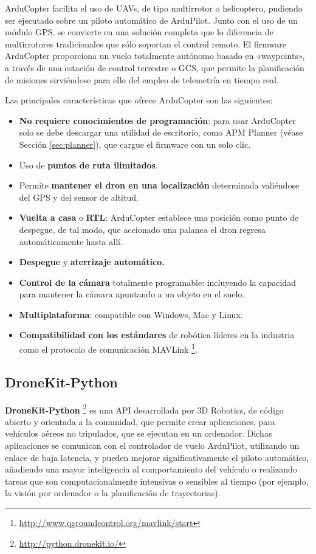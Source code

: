 ArduCopter facilita el uso de \acs{UAV}s, de tipo multirrotor o helicoptero, pudiendo ser ejecutado sobre un piloto automático de ArduPilot.
Junto con el uso de un módulo \acs{GPS}, se convierte en una solución completa que lo diferencia de multirrotores tradicionales que sólo 
soportan el control remoto. El firmware ArduCopter proporciona un vuelo totalmente autónomo basado en «waypoints», a través de 
una estación de control terrestre o \acs{GCS}, que permite la planificación de misiones sirviéndose para ello del empleo de telemetría en tiempo real.

Las principales características que ofrece ArduCopter son las siguientes:
\begin{itemize}
\item \textbf{No requiere conocimientos de programación}: para usar ArduCopter solo se debe descargar una utilidad de escritorio, como 
APM Planner (véase Sección \ref{sec:planner}), que cargue el firmware con un solo clic.
\item Uso de \textbf{puntos de ruta ilimitados}.
\item Permite \textbf{mantener el dron en una localización} determinada valiéndose del \acs{GPS} y del sensor de altitud.
\item \textbf{Vuelta a casa} o \textbf{\acs{RTL}}: ArduCopter establece una posición como punto de despegue, de tal modo, que accionado una palanca el dron regresa automáticamente hasta allí.
\item \textbf{Despegue} y \textbf{aterrizaje automático.}
\item \textbf{Control de la cámara} totalmente programable: incluyendo la capacidad para mantener la cámara apuntando a un objeto en el suelo.
\item \textbf{Multiplataforma}: compatible con Windows, Mac y Linux.
\item \textbf{Compatibilidad con los estándares} de robótica líderes en la industria como el protocolo de comunicación MAVLink \footnote{\url{http://www.qgroundcontrol.org/mavlink/start}}.
\end{itemize}

\subsection{DroneKit-Python}
\label{sec:dronekit}

\textbf{DroneKit-Python} \footnote{\url{http://python.dronekit.io/}} es una \acs{API} desarrollada por 3D Robotics, de código abierto y orientada a la comunidad, que permite crear aplicaciones, para vehículos aéreos no tripulados, que se 
ejecutan en un ordenador. Dichas aplicaciones se comunican con el controlador de vuelo ArduPilot, utilizando un enlace de baja latencia, y pueden mejorar significativamente el piloto automático, añadiendo una mayor inteligencia al comportamiento del vehículo o realizando tareas que son computacionalmente intensivas o sensibles al tiempo (por ejemplo, la visión por ordenador o la planificación de trayectorias).


